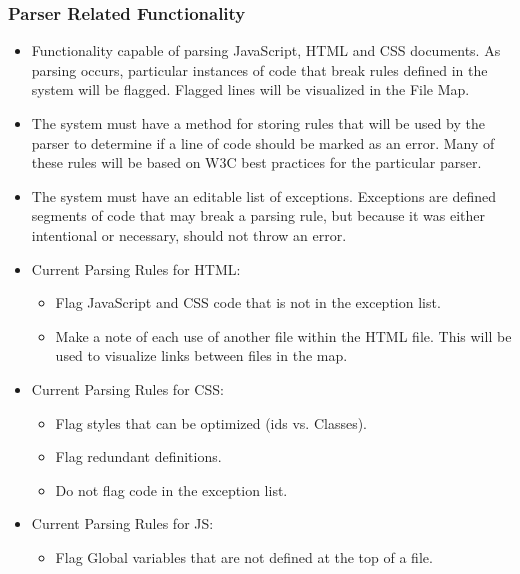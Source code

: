 \documentclass[letterpaper,10pt,titlepage,draftclsnofoot,onecolumn,onesided] {IEEEtran}
\begin{document}
\subsubsection{Parser Related Functionality}
\begin{itemize}
	\item Functionality capable of parsing JavaScript, HTML and CSS documents. 
	As parsing occurs, particular instances of code that break rules defined in the system will be flagged. 
	Flagged lines will be visualized in the File Map.
	\item The system must have a method for storing rules that will be used by the parser to determine if a line of code should be marked as an error.
	Many of these rules will be based on W3C best practices for the particular parser.
	\item The system must have an editable list of exceptions. 
	Exceptions are defined segments of code that may break a parsing rule, but because it was either intentional or necessary, should not throw an error.
	\item Current Parsing Rules for HTML:
		\begin{itemize}
			\item Flag JavaScript and CSS code that is not in the exception list.
			\item Make a note of each use of another file within the HTML file. This will be used to visualize links between files in the map.
		\end{itemize}
	\item Current Parsing Rules for CSS:
		\begin{itemize}
			\item Flag styles that can be optimized (ids vs. Classes).
			\item Flag redundant definitions.
			\item Do not flag code in the exception list.
		\end{itemize}
	\item Current Parsing Rules for JS:
		\begin{itemize}
			\item Flag Global variables that are not defined at the top of a file.
		\end{itemize}
\end{itemize}
\end{document}
